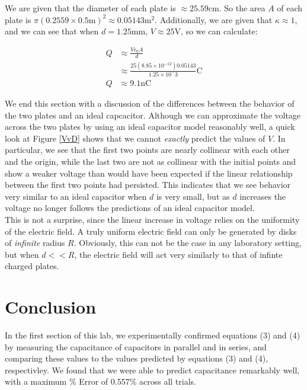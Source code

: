 \documentclass[oneside,12pt]{amsart}
\begin{document}
	 \indent We are given that the diameter of each plate is $\approx 25.59$cm. So the area $A$ of each plate is $\pi(0.2559\times0.5\text{m})^2\approx 0.05143\text{m}^2$. Additionally, we are given that $\kappa \approx 1$, and we can see that when $d = 1.25$mm, $V \approx 25$V, so we can calculate:
	 
	 \begin{align*}
	 	Q&\approx \frac{V\epsilon_0A}{d}\\
	 	&\approx \frac{25 (8.85\times 10^{-12})0.05143}{1.25\times 10^-3}\text{C}\\
	 	Q&\approx 9.1\text{nC}	 	
	 \end{align*}
	 
	 \indent We end this section with a discussion of the differences between the behavior of the two plates and an ideal capcacitor. Although we can approximate the voltage across the two plates by using an ideal capacitor model reasonably well, a quick look at Figure \ref{VvD} shows that we cannot \textit{exactly} predict the values of $V$. In particular, we see that the first two points are nearly collinear with each other and the origin, while the last two are not as collinear with the initial points and show a weaker voltage than would have been expected if the linear relationship between the first two points had persisted. This indicates that we see behavior very similar to an ideal capacitor when $d$ is very small, but as $d$ increases the voltage no longer follows the predictions of an ideal capacitor model.\\
	 
	 \indent This is not a surprise, since the linear increase in voltage relies on the uniformity of the electric field. A truly uniform electric field can only be generated by disks of \textit{infinite} radius $R$. Obviously, this can not be the case in any laboratory setting, but when $d<<R$, the electric field will act very similarly to that of infinte charged plates.
	 
	 \section{Conclusion}
	 In the first section of this lab, we experimentally confirmed equations (3) and (4) by measuring the capacitance of capacitors in parallel and in series, and comparing these values to the values predicted by equations (3) and (4), respectivley. We found that we were able to predict capacitance remarkably well, with a maximum \% Error of 0.557\% across all trials.\\
	 
\end{document}
